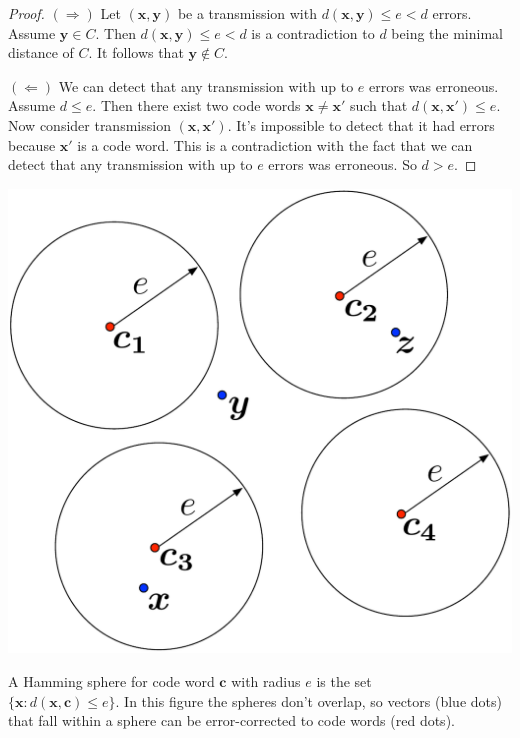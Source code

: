 \begin{proof}

\noindent$(\Rightarrow)$ Let $(\bm{x}, \bm{y})$ be a transmission with $d(\bm{x}, \bm{y}) \leq e < d$ errors. Assume $\bm{y} \in C$. Then $d(\bm{x}, \bm{y}) \leq e < d$ is a contradiction to $d$ being the minimal distance of $C$. It follows that $\bm{y} \notin C$.

\noindent$(\Leftarrow)$ We can detect that any transmission with up to $e$ errors was erroneous. Assume $d \leq e$. Then there exist two code words $\bm{x} \neq \bm{x'}$ such that $d(\bm{x}, \bm{x'}) \leq e$. Now consider transmission $(\bm{x}, \bm{x'})$. It's impossible to detect that it had errors because $\bm{x'}$ is a code word. This is a contradiction with the fact that we can detect that any transmission with up to $e$ errors was erroneous. So $d > e$.
\end{proof}

\begin{marginfigure}[0.5in]
\includegraphics[scale=0.3]{hammingSpheres.pdf}
\caption{A Hamming sphere for code word $\bm{c}$ with radius  $e$ is the set \\
$\{\bm{x}: d(\bm{x}, \bm{c}) \leq e\}$. In this figure the spheres don't overlap, so vectors (blue dots) that fall within a sphere can be error-corrected to code words (red dots).}
\label{fig:hammingSpheres}
\end{marginfigure}

